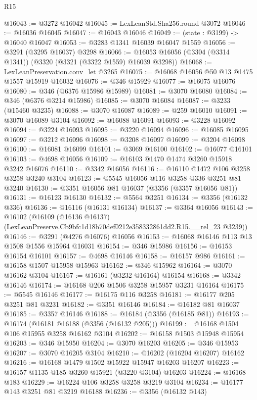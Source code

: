 \begin{lexlean}{R15}
\begin{coremodule}
@16043 := @3272 @16042
@16045 := LexLeanStd.Sha256.round @3072
@16046 := @16036 @16045
@16047 := @16043 @16046
@16049 := (state : @3199) -> @16040 @16047
@16053 := @3283 @1341 @16039 @16047 @1559
@16056 := @3291 (@3295 @16037) @3298
@16066 := @16053 @16056 (@3304 (@3314 @1341)) (@3320 (@3321 (@3322 @1559) @16039 @3298))
@16068 := LexLeanPreservation.conv_let @3265
@16075 := @16068 @16056 @50 @13 @1475 @1557 @15919 @16032
@16076 := @346 @15929
@16077 := @16075 @16076
@16080 := @346 (@6376 @15986 @15989)
@16081 := @3070 @16080
@16084 := @346 (@6376 @3214 @15986)
@16085 := @3070 @16084
@16087 := @3233 (@15460 @3235)
@16088 := @3070 @16087
@16089 := @259 @16010
@16091 := @3070 @16089 @3104
@16092 := @16088 @16091
@16093 := @3228 @16092
@16094 := @3224 @16093
@16095 := @3220 @16094
@16096 := @16085 @16095
@16097 := @3212 @16096
@16098 := @3208 @16097
@16099 := @3204 @16098
@16100 := @16081 @16099
@16101 := @3069 @16100
@16102 := @16077 @16101
@16103 := @4698 @16056
@16109 := @16103 @1470 @1474 @3260 @15918 @3242 @16076
@16110 := @3342 @16056
@16116 := @16110 @1472 @106 @3258 @3258 @3240 @3104
@16123 := @5545 @16056 @116 @3258 @336 @3251 @81 @3240
@16130 := @3351 @16056 @81 @16037 (@3356 (@3357 @16056 @81))
@16131 := @16123 @16130
@16132 := @5564 @3251
@16134 := @3356 (@16132 @336)
@16136 := @16116 (@16131 @16134)
@16137 := @3364 @16056
@16143 := @16102
    (@16109 (@16136 @16137) (LexLeanPreserve.Cb9bfc1d18b70def0212e358332861dd2.R15.__rel_23 @3239))
@16146 := @3291 (@4276 @16076) @16056
@16153 := @16068 @16146 @113 @13 @1508 @1556 @15964 @16031
@16154 := @346 @15986
@16156 := @16153 @16154 @16101
@16157 := @4698 @16146
@16158 := @16157 @986
@16161 := @16158 @1507 @15958 @15963
@16162 := @346 @15962
@16164 := @3070 @16162 @3104
@16167 := @16161 (@3232 @16164) @16154
@16168 := @3342 @16146
@16174 := @16168 @206 @1506 @3258 @15957 @3231 @16164
@16175 := @5545 @16146
@16177 := @16175 @116 @3258
@16181 := @16177 @205 @3251 @81 @3231
@16182 := @3351 @16146
@16184 := @16182 @81 @16037
@16185 := @3357 @16146
@16188 := @16184 (@3356 (@16185 @81))
@16193 := @16174 (@16181 @16188 (@3356 (@16132 @205)))
@16199 := @16168 @1504 @106 @15955 @3258 @16162 @3104
@16202 := @16158 @1503 @15948 @15954
@16203 := @346 @15950
@16204 := @3070 @16203
@16205 := @346 @15953
@16207 := @3070 @16205 @3104
@16210 := @16202 (@16204 @16207) @16162
@16216 := @16168 @1479 @1502 @15922 @15947 @16203 @16207
@16223 := @16157 @1135 @185 @3260 @15921 (@3220 @3104) @16203
@16224 := @16168 @183
@16229 := @16224 @106 @3258 @3258 @3219 @3104
@16234 := @16177 @143 @3251 @81 @3219 @16188
@16236 := @3356 (@16132 @143)

\end{coremodule}
\end{lexlean}
